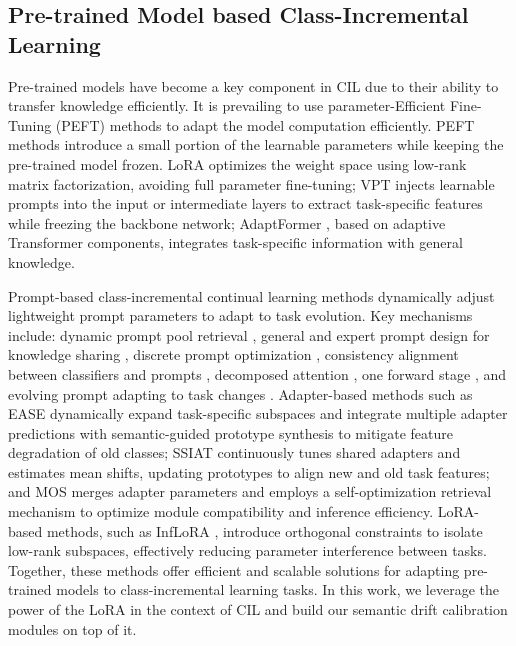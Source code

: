 
\subsection{Pre-trained Model based Class-Incremental Learning}
Pre-trained models have become a key component in CIL due to their ability to transfer knowledge efficiently. It is prevailing to use parameter-Efficient Fine-Tuning (PEFT) methods to adapt the model computation efficiently. PEFT methods introduce a small portion of the learnable parameters while keeping the pre-trained model frozen. LoRA \cite{hu2022lora} optimizes the weight space using low-rank matrix factorization, avoiding full parameter fine-tuning; VPT \cite{jia2022visual} injects learnable prompts into the input or intermediate layers to extract task-specific features while freezing the backbone network; AdaptFormer \cite{chen2022adaptformer}, based on adaptive Transformer components, integrates task-specific information with general knowledge. 

Prompt-based class-incremental continual learning methods dynamically adjust lightweight prompt parameters to adapt to task evolution. Key mechanisms include: dynamic prompt pool retrieval \cite{wang2022learning}, general and expert prompt design for knowledge sharing \cite{wang2022dualprompt}, discrete prompt optimization \cite{jiao2024vector}, consistency alignment between classifiers and prompts \cite{gao2024consistent}, decomposed attention \cite{smith2023coda}, one forward stage \cite{kim2024one}, and evolving prompt adapting to task changes \cite{kurniawan2024evoprompt}.  Adapter-based methods such as EASE \cite{zhou2024expandable} dynamically expand task-specific subspaces and integrate multiple adapter predictions with semantic-guided prototype synthesis to mitigate feature degradation of old classes; SSIAT \cite{tan2024semantically} continuously tunes shared adapters and estimates mean shifts, updating prototypes to align new and old task features; and MOS \cite{sun2024mos} merges adapter parameters and employs a self-optimization retrieval mechanism to optimize module compatibility and inference efficiency.  LoRA-based methods, such as InfLoRA \cite{liang2024inflora}, introduce orthogonal constraints to isolate low-rank subspaces, effectively reducing parameter interference between tasks. Together, these methods offer efficient and scalable solutions for adapting pre-trained models to class-incremental learning tasks. In this work, we leverage the power of the LoRA in the context of CIL and build our semantic drift calibration modules on top of it.  